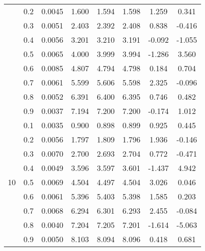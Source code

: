 \documentclass[11pt,a4paper]{report}
\begin{document}
\begin{longtable}{ | c | c || c | c | c | c | c | c | }
 & 0.2 & 0.0045 & 1.600 & 1.594 & 1.598 & 1.259 & 0.341 \\
 & 0.3 & 0.0051 & 2.403 & 2.392 & 2.408 & 0.838 & -0.416 \\
 & 0.4 & 0.0056 & 3.201 & 3.210 & 3.191 & -0.092 & -1.055 \\
 & 0.5 & 0.0065 & 4.000 & 3.999 & 3.994 & -1.286 & 3.560 \\
 & 0.6 & 0.0085 & 4.807 & 4.794 & 4.798 & 0.184 & 0.704 \\
 & 0.7 & 0.0061 & 5.599 & 5.606 & 5.598 & 2.325 & -0.096 \\
 & 0.8 & 0.0052 & 6.391 & 6.400 & 6.395 & 0.746 & 0.482 \\
 & 0.9 & 0.0037 & 7.194 & 7.200 & 7.200 & -0.174 & 1.012 \\
 \hline
\multirow{9}{*}{10} & 0.1 & 0.0035 & 0.900 & 0.898 & 0.899 & 0.925 & 0.445 \\
 & 0.2 & 0.0056 & 1.797 & 1.809 & 1.796 & 1.936 & -0.146 \\
 & 0.3 & 0.0070 & 2.700 & 2.693 & 2.704 & 0.772 & -0.471 \\
 & 0.4 & 0.0049 & 3.596 & 3.597 & 3.601 & -1.437 & 4.942 \\
 & 0.5 & 0.0069 & 4.504 & 4.497 & 4.504 & 3.026 & 0.046 \\
 & 0.6 & 0.0061 & 5.396 & 5.403 & 5.398 & 1.585 & 0.203 \\
 & 0.7 & 0.0068 & 6.294 & 6.301 & 6.293 & 2.455 & -0.084 \\
 & 0.8 & 0.0040 & 7.204 & 7.205 & 7.201 & -1.614 & -5.063 \\
 & 0.9 & 0.0050 & 8.103 & 8.094 & 8.096 & 0.418 & 0.681 \\
 \hline
\hline
\end{longtable}
\end{document}

